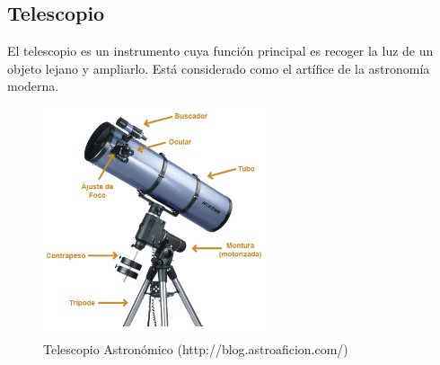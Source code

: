 





\subsection{Telescopio}
El telescopio es un instrumento cuya función principal es recoger la luz de un objeto lejano y ampliarlo. Está considerado como el artífice de la astronomía moderna. \\


\begin{figure}[htb]
\centering
\includegraphics[width=0.6\textwidth]{./imagenes/telescopio}
\caption{Telescopio Astronómico (http://blog.astroaficion.com/)} \label{fig:telescopio}
\end{figure}
